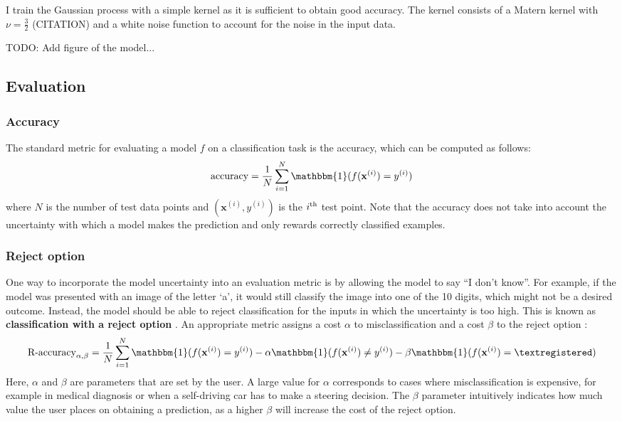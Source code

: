 \documentclass{article}
\begin{document}
I train the Gaussian process with a simple kernel as it is sufficient to obtain good accuracy. The kernel consists of a Matern kernel with $\nu =\frac{3}{2}$ (CITATION) and a white noise function to account for the noise in the input data.

TODO: Add figure of the model...

\subsection{Evaluation}
\subsubsection{Accuracy}
The standard metric for evaluating a model $f$ on a classification task is the accuracy, which can be computed as follows: 
\begin{equation*}
	\textrm{accuracy} = \frac{1}{N} \sum_{i=1}^N \mathbbm{1}(f(\mathbf{x}^{(i)}) = y^{(i)})
\end{equation*}
where $N$ is the number of test data points and $(\mathbf{x}^{(i)}, y^{(i)})$ is the $i\textsuperscript{th}$ test point. Note that the accuracy does not take into account the uncertainty with which a model makes the prediction and only rewards correctly classified examples.

\subsubsection{Reject option}
\label{section/reject_option}
One way to incorporate the model uncertainty into an evaluation metric is by allowing the model to say ``I don't know''. For example, if the model was presented with an image of the letter `a', it would still classify the image into one of the 10 digits, which might not be a desired outcome. Instead, the model should be able to reject classification for the inputs in which the uncertainty is too high. This is known as \textbf{classification with a reject option} \cite{chow1970optimum}. An appropriate metric assigns a cost $\alpha$ to misclassification and a cost $\beta$ to the reject option \textregistered:
\begin{equation*}
	\textrm{R-accuracy}_{\alpha, \beta} = \frac{1}{N} \sum_{i=1}^N \mathbbm{1}(f(\mathbf{x}^{(i)}) = y^{(i)}) - \alpha \mathbbm{1}(f(\mathbf{x}^{(i)}) \neq y^{(i)}) - \beta \mathbbm{1}(f(\mathbf{x}^{(i)}) = \textregistered)
\end{equation*}
Here, $\alpha$ and $\beta$ are parameters that are set by the user. A large value for $\alpha$ corresponds to cases where misclassification is expensive, for example in medical diagnosis or when a self-driving car has to make a steering decision. The $\beta$ parameter intuitively indicates how much value the user places on obtaining a prediction, as a higher $\beta$ will increase the cost of the reject option.
\end{document}
